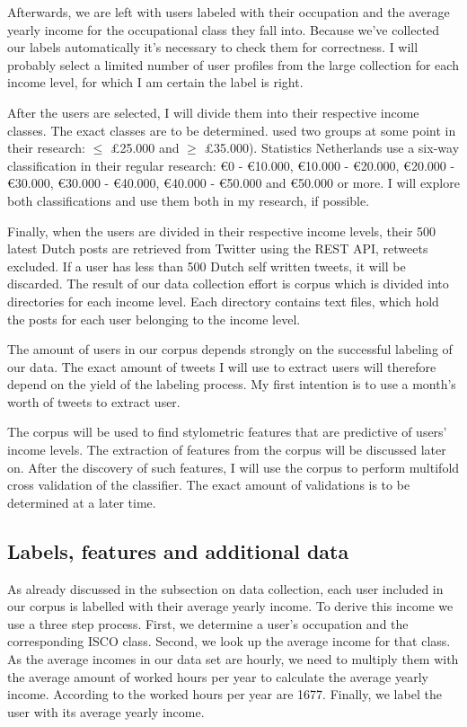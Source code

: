 \documentclass[11pt, a4paper]{article}
\begin{document}
Afterwards, we are left with users labeled with their occupation and the average yearly income for the occupational class they fall into. Because we've collected our labels automatically it's necessary to check them for correctness. I will probably select a limited number of user profiles from the large collection for each income level, for which I am certain the label is right. 

After the users are selected, I will divide them into their respective income classes. The exact classes are to be determined. \citet{flekova} used two groups at some point in their research: $\leq$ \pounds 25.000 and $\geq$ \pounds 35.000). Statistics Netherlands use a six-way classification in their regular research: \euro 0 - \euro 10.000, \euro 10.000 - \euro 20.000, \euro 20.000 - \euro 30.000, \euro 30.000 - \euro 40.000, \euro 40.000 - \euro 50.000 and \euro 50.000 or more. I will explore both classifications and use them both in my research, if possible.

Finally, when the users are divided in their respective income levels, their 500 latest Dutch posts are retrieved from Twitter using the REST API, retweets excluded. If a user has less than 500 Dutch self written tweets, it will be discarded. The result of our data collection effort is corpus which is divided into directories for each income level. Each directory contains text files, which hold the posts for each user belonging to the income level. 

The amount of users in our corpus depends strongly on the successful labeling of our data. The exact amount of tweets I will use to extract users will therefore depend on the yield of the labeling process. My first intention is to use a month's worth of tweets to extract user.

The corpus will be used to find stylometric features that are predictive of users' income levels. The extraction of features from the corpus will be discussed later on. After the discovery of such features, I will use the corpus to perform multifold cross validation of the classifier. The exact amount of validations is to be determined at a later time.

\subsection{Labels, features and additional data}
As already discussed in the subsection on data collection, each user included in our corpus is labelled with their average yearly income. To derive this income we use a three step process. First, we determine a user's occupation and the corresponding ISCO class. Second, we look up the average income for that class. As the average incomes in our data set are hourly, we need to multiply them with the average amount of worked hours per year to calculate the average yearly income. According to \citet{hours} the worked hours per year are 1677. Finally, we label the user with its average yearly income.
\end{document}
